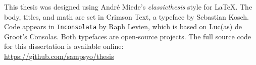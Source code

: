 This thesis was designed using Andr\'e Miede's
\textit{classicthesis} style for \LaTeX.
The body, titles, and math are set in Crimson Text, a typeface by Sebastian Kosch.
Code appears in \texttt{Inconsolata} by Raph Levien, which is based on Luc(as)
de Groot's Consolas.
Both typefaces are open-source projects.
The full source code for this dissertation is available online: \\
\url{https://github.com/sampsyo/thesis}
